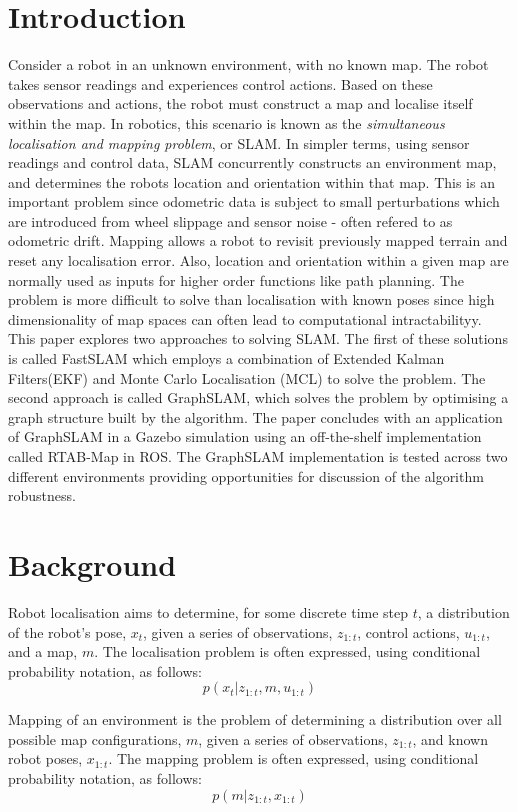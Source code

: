 \documentclass[a4paper]{article}
\begin{document}
\section{Introduction}
Consider a robot in an unknown environment, with no known map. The robot takes sensor readings and experiences control actions. Based on these observations and actions, the robot must construct a map and localise itself within the map. In robotics, this scenario is known as the \textit{simultaneous localisation and mapping problem}, or SLAM. In simpler terms, using sensor readings and control data, SLAM concurrently constructs an environment map, and determines the robots location and orientation within that map. This is an important problem since odometric data is subject to small perturbations which are introduced from wheel slippage and sensor noise - often refered to as odometric drift. Mapping allows a robot to revisit previously mapped terrain and reset any localisation error. Also, location and orientation within a given map are normally used as inputs for higher order functions like path planning. The problem is more difficult to solve than localisation with known poses since high dimensionality of map spaces can often lead to computational intractabilityy. This paper explores two approaches to solving SLAM. The first of these solutions is called FastSLAM which employs a combination of Extended Kalman Filters(EKF) and Monte Carlo Localisation (MCL) to solve the problem. The second approach is called GraphSLAM, which solves the problem by optimising a graph structure built by the algorithm. The paper concludes with an application of GraphSLAM in a Gazebo simulation using an off-the-shelf implementation called RTAB-Map in ROS. The GraphSLAM implementation is tested across two different environments providing opportunities for discussion of the algorithm robustness.

\section{Background}
Robot localisation aims to determine, for some discrete time step $t$, a distribution of the robot's pose, $x_t$, given a series of observations, $z_{1:t}$, control actions, $u_{1:t}$, and a map, $m$. The localisation problem is often expressed, using conditional probability notation, as follows:
\begin{equation}
p(x_t | z_{1:t}, m, u_{1:t})
\end{equation}

Mapping of an environment is the problem of determining a distribution over all possible map configurations, $m$, given a series of observations, $z_{1:t}$, and known robot poses, $x_{1:t}$. The mapping problem is often expressed, using conditional probability notation, as follows:
\begin{equation}
p(m | z_{1:t}, x_{1:t})
\end{equation}
\end{document}
